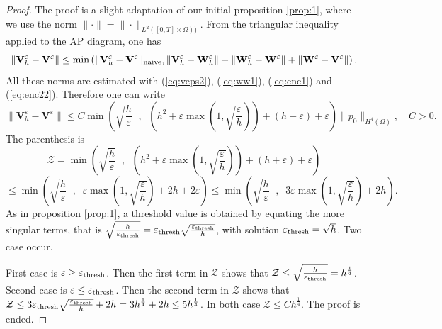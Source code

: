 \documentclass[a4paper,french,english,10pt]{article}
\newcommand\eps{\varepsilon}
\newcommand\V{\mathbf{V}}
\newcommand\W{\mathbf{W}}
\begin{document}
\begin{proof}
The proof is a slight adaptation of our initial proposition
\ref{prop:1}, where we use the norm
$\|\cdot\|=\|\cdot\|_{L^2([0,T]\times\Omega)   ) }$.
From the triangular inequality applied to the AP diagram,
one has 
$$
\|\V_h^\eps-\V^\eps\|\leq
\min \left(
\|\V_h^\eps-\V^\eps\|_{\rm naive},
\|\V_h^\eps-\mathbf{W}^\eps_h\|
+
\|\mathbf{W}^\eps_h-\W^\eps\|
+
\|\W^\eps-\V^\eps\|
\right).
$$
All these norms are estimated with 
(\ref{eq:veps2}), (\ref{eq:ww1}), (\ref{eq:enc1}) and (\ref{eq:enc22}).
Therefore one can write 
$$
\|\V_h^\eps-\V^\eps\|\leq
C\min \left(
\sqrt{\frac h \eps  } \; \; , \; \; 
\left( h^2+
\eps \max\left(1, \sqrt{\frac \eps h } \right) \right)+
 \left(h +\eps
\right) +\eps
\right) \|    p_0  \| _{H^4(\Omega)}, \quad C>0.
$$
The parenthesis is
$$
\mathcal Z=
\min \left(
\sqrt{\frac h \eps  } \; \; , \; \; 
\left( h^2+
\eps \max\left(1, \sqrt{\frac \eps h } \right) \right)+
 \left(h +\eps
\right) +\eps
\right)
$$
$$
\leq \min \left(
\sqrt{\frac h \eps  } \; \; , \; \; 
\eps \max\left(1, \sqrt{\frac \eps h } \right) %
+
 2 h +2\eps
\right)
\leq \min \left(
\sqrt{\frac h \eps  } \; \; , \; \; 
3 
\eps \max\left(1, \sqrt{\frac \eps h } \right) %
+
 2 h %
\right).
$$
As in proposition \ref{prop:1}, a threshold value is obtained by equating
the more singular terms, that is 
$
\sqrt{\frac {h }{\eps_{\rm thresh}}  }=\eps_{\rm thresh} \sqrt{
 \frac{\eps_{\rm thresh}}{h}}$, with solution
$\eps_{\rm thresh}= \sqrt h$. 
Two case occur.

First case is $\varepsilon \geq \eps_{\rm thresh}$. Then the  first term in $\mathcal Z$ shows that
$
\mathcal Z\leq \sqrt{\frac {h }{\eps_{\rm thresh}}  } = h^{\frac14}$.
Second case is $\varepsilon \leq \eps_{\rm thresh}$. Then the  second
 term in $\mathcal Z$ shows that
 $
 \mathcal Z\leq 3 \eps_{\rm thresh}\sqrt{\frac {\eps_{\rm thresh}}{h }  } + 2 h = 3 h^{\frac14}+ 2h \leq 
 5 h^\frac14$. 
 In both case $\mathcal Z\leq C h^{\frac14}$. The proof is ended.
%
\end{proof}
\end{document}
